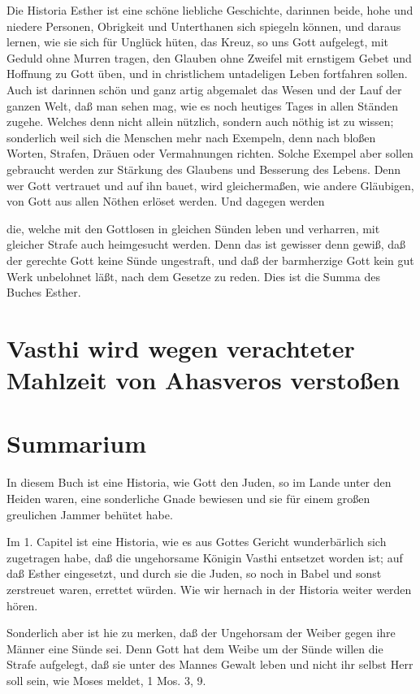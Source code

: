 Die Historia Esther ist eine schöne liebliche Geschichte, darinnen beide, hohe und niedere Personen, Obrigkeit und Unterthanen sich spiegeln können, und daraus lernen, wie sie sich für Unglück hüten, das Kreuz, so uns Gott aufgelegt, mit Geduld ohne Murren tragen, den Glauben ohne Zweifel mit ernstigem Gebet und Hoffnung zu Gott üben, und in christlichem untadeligen Leben fortfahren sollen. Auch ist darinnen schön und ganz artig abgemalet das Wesen und der Lauf der ganzen Welt, daß man sehen mag, wie es noch heutiges Tages in allen Ständen zugehe. Welches denn nicht allein nützlich, sondern auch nöthig ist zu wissen; sonderlich weil sich die Menschen mehr nach Exempeln, denn nach bloßen Worten, Strafen, Dräuen oder Vermahnungen richten. Solche Exempel aber sollen gebraucht werden zur Stärkung des Glaubens und Besserung des Lebens. Denn wer Gott vertrauet und auf ihn bauet, wird gleichermaßen, wie andere Gläubigen, von Gott aus allen Nöthen erlöset werden. Und dagegen werden

die, welche mit den Gottlosen in gleichen Sünden leben und verharren, mit gleicher Strafe auch heimgesucht werden. Denn das ist gewisser denn gewiß, daß der gerechte Gott keine Sünde ungestraft, und daß der barmherzige Gott kein gut Werk unbelohnet läßt, nach dem Gesetze zu reden. Dies ist die Summa des Buches Esther.

\section{Vasthi wird wegen verachteter Mahlzeit von Ahasveros verstoßen}


\section{Summarium}

In diesem Buch ist eine Historia, wie Gott den Juden, so im Lande unter den Heiden waren, eine sonderliche Gnade bewiesen und sie für einem großen greulichen Jammer behütet habe.

Im 1. Capitel ist eine Historia, wie es aus Gottes Gericht wunderbärlich sich zugetragen habe, daß die ungehorsame Königin Vasthi entsetzet worden ist; auf daß Esther eingesetzt, und durch sie die Juden, so noch in Babel und sonst zerstreuet waren, errettet würden. Wie wir hernach in der Historia weiter werden hören.

Sonderlich aber ist hie zu merken, daß der Ungehorsam der Weiber gegen ihre Männer eine Sünde sei. Denn Gott hat dem Weibe um der Sünde willen die Strafe aufgelegt, daß sie unter des Mannes Gewalt leben und nicht ihr selbst Herr soll sein, wie Moses meldet, 1 Mos. 3, 9.

